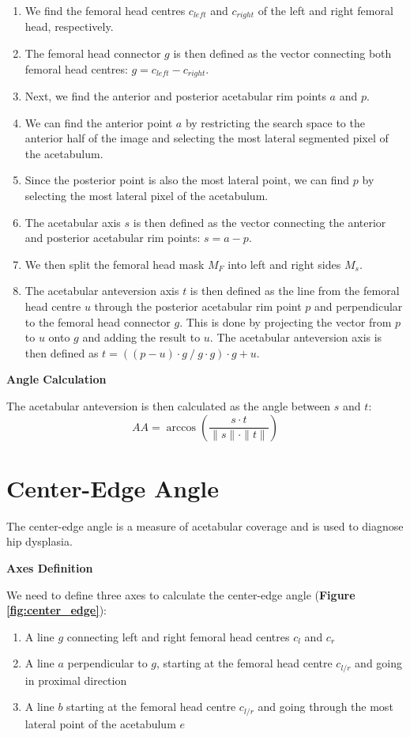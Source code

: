 \documentclass[a4paper,12pt]{article}
\newcommand{\subheading}[1]{\bigskip \large \noindent \textbf{#1}\bigskip \normalsize}
\begin{document}
	\begin{enumerate}
		\item We find the femoral head centres $c_{left}$ and $c_{right}$ of the left and right femoral head, respectively.
		\item The femoral head connector $g$ is then defined as the vector connecting both femoral head centres: $g = c_{left} - c_{right}$.
		\item Next, we find the anterior and posterior acetabular rim points $a$ and $p$.
		\item We can find the anterior point $a$ by restricting the search space to the anterior half of the image and selecting the most lateral segmented pixel of the acetabulum.
		\item Since the posterior point is also the most lateral point, we can find $p$ by selecting the most lateral pixel of the acetabulum.
		\item The acetabular axis $s$ is then defined as the vector connecting the anterior and posterior acetabular rim points: $s = a - p$.
		\item We then split the femoral head mask $M_F$ into left and right sides $M_s$.
		\item The acetabular anteversion axis $t$ is then defined as the line from the femoral head centre $u$ through the posterior acetabular rim point $p$ and perpendicular to the femoral head connector $g$. This is done by projecting the vector from $p$ to $u$ onto $g$ and adding the result to $u$. The acetabular anteversion axis is then defined as $t = ((p - u) \cdot g \: / \: g \cdot g) \cdot g + u$.
	\end{enumerate}

	\subheading{Angle Calculation}

	\noindent The acetabular anteversion is then calculated as the angle between $s$ and $t$: \[AA = \arccos\left(\frac{s \cdot t}{\|s\| \cdot \|t\|}\right)\]

	\section{Center-Edge Angle}
	\label{sec:cea}
	\noindent The center-edge angle is a measure of acetabular coverage and is used to diagnose hip dysplasia.

	\subheading{Axes Definition}

	\noindent We need to define three axes to calculate the center-edge angle (\textbf{Figure \ref{fig:center_edge}}):
	\begin{enumerate}
		\item A line $g$ connecting left and right femoral head centres $c_l$ and $c_r$
		\item A line $a$ perpendicular to $g$, starting at the femoral head centre $c_{l/r}$ and going in proximal direction
		\item A line $b$ starting at the femoral head centre $c_{l/r}$ and going through the most lateral point of the acetabulum $e$
	\end{enumerate}
\end{document}
